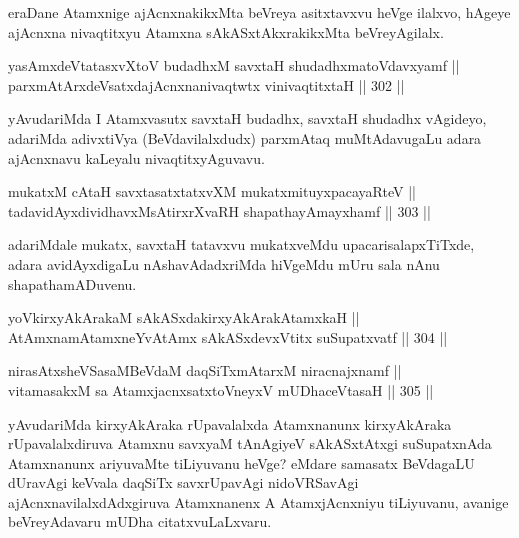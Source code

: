 \begin{artha}
eraDane Atamxnige ajAcnxnakikxMta beVreya asitxtavxvu heVge ilalxvo, hAgeye ajAcnxna nivaqtitxyu Atamxna sAkASxtAkxrakikxMta beVreyAgilalx.
\end{artha}

\begin{shl}
yasAmxdeVtatasxvXtoV budadhxM savxtaH shudadhxmatoV\s davxyamf || \\
parxmAtArxdeVsatxdajAcnxnanivaqtwtx vinivaqtitxtaH \hfill || 302 || 
\end{shl}

\begin{artha}
yAvudariMda I Atamxvasutx savxtaH budadhx, savxtaH shudadhx vAgideyo,
adariMda adivxtiVya (BeVdavilalxdudx) parxmAtaq muMtAdavugaLu adara
ajAcnxnavu kaLeyalu nivaqtitxyAguvavu.
\end{artha}

\begin{shl}
mukatxM cAtaH savxtasatxtatxvXM mukatxmituyxpacayaRteV || \\
tadavidAyxdividhavxMsAtirxrXvaRH shapathayAmayxhamf \hfill || 303 ||  
\end{shl}

\begin{artha}
adariMdale mukatx, savxtaH tatavxvu mukatxveMdu upacarisalapxTiTxde,
adara avidAyxdigaLu nAshavAdadxriMda hiVgeMdu mUru sala nAnu
shapathamADuvenu.
\end{artha}

\begin{shl}
yoV\s kirxyAkArakaM sAkASxdakirxyAkArakAtamxkaH || \\
AtAmxnamAtamxneYvA\s \s tAmx sAkASxdevxVtitx suSupatxvatf \hfill || 304 ||  
\end{shl}

\begin{shl}
nirasAtxsheVSasaMBeVdaM daqSiTxmAtarxM niracnajxnamf || \\
vitamasakxM sa AtamxjacnxsatxtoV\s neyxV mUDhaceVtasaH \hfill || 305 ||  
\end{shl}

\begin{artha}
yAvudariMda kirxyAkAraka rUpavalalxda Atamxnanunx kirxyAkAraka
rUpavalalxdiruva Atamxnu savxyaM tAnAgiyeV sAkASxtAtxgi suSupatxnAda
Atamxnanunx ariyuvaMte tiLiyuvanu heVge? eMdare samasatx BeVdagaLU
dUravAgi keVvala daqSiTx savxrUpavAgi nidoVRSavAgi
ajAcnxnavilalxdAdxgiruva Atamxnanenx A AtamxjAcnxniyu tiLiyuvanu,
avanige beVreyAdavaru mUDha citatxvuLaLxvaru.
\end{artha}


